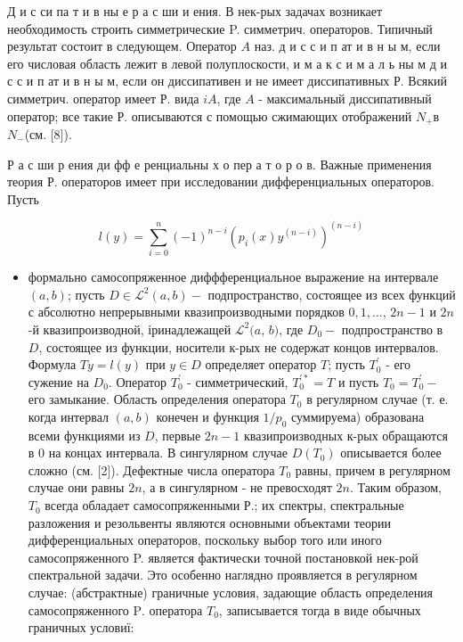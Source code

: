 \documentclass[10pt]{article}
\begin{document}
Д и с си па т и в ны е р а с ши и ения. В нек-рых задачах возникает необходимость строить симметрические P. симметрич. операторов. Типичный результат состоит в следующем. Оператор $A$ наз. д и с с и п ат и в н ы м, если его числовая область лежит в левой полуплоскости, и м а к с и м а л ь ны м д и с с и п ат и в н ы м, если он диссипативен и не имеет диссипативных Р. Всякий симметрич. оператор имеет Р. вида $i A$, где $A$ - максимальный диссипативный оператор; все такие Р. описываются с помощью сжимающих отображений $N_{+}$в $N_{-}$(см. [8]).



Р а с ши р ения ди фф е ренциальны х о пер а т о р о в. Важные применения теория Р. операторов имеет при исследовании дифференциальных операторов. Пусть



\[

l(y)=\sum_{i=0}^{n}(-1)^{n-i}\left(p_{i}(x) y^{(n-i)}\right)^{(n-i)}

\]



\begin{itemize}

  \item формально самосопряженное диффференциальное выражение на интервале $(a, b)$; пусть $D \in \mathscr{L}^{2}(a, b)-$ подпространство, состоящее из всех функций с абсолютно непрерывными квазипроизводными порядков $0,1, \ldots$, $2 n-1$ и $2 n$-й квазипроизводной, іринадлежащей $\mathscr{L}^{2}(a$, $b)$, где $D_{0}-$ подпространство в $D$, состоящее из функции, носители к-рых не содержат концов интервалов. Формула $T y=l(y)$ при $y \in D$ определяет оператор $T$; пусть $T_{0}^{\prime}$ - его сужение на $D_{0}$. Оператор $T_{0}^{\prime}$ - симметрический, $T_{0}^{\prime *}=T$ и пусть $T_{0}=T_{0}^{\prime}-$ его замыкание. Область определения оператора $T_{0}$ в регулярном случае (т. е. когда интервал $(a, b)$ конечен и функция $1 / p_{0}$ суммируема) образована всеми функциями из $D$, первые $2 n-1$ квазипроизводных к-рых обращаются в 0 на концах интервала. В сингулярном случае $D\left(T_{0}\right)$ описывается более сложно (см. [2]). Дефектные числа оператора $T_{0}$ равны, причем в регулярном случае они равны $2 n$, а в сингулярном - не превосходят $2 n$. Таким образом, $T_{0}$ всегда обладает самосопряженными Р.; их спектры, спектральные разложения и резольвенты являются основными объектами теории дифференциальных операторов, поскольку выбор того или иного самосопряженного P. является фактически точной постановкой нек-рой спектральной задачи. Это особенно наглядно проявляется в регулярном случае: (абстрактные) граничные условия, задающие область определения самосопряженного $\mathrm{P}$. оператора $T_{0}$, записывается тогда в виде обычных граничных условиї:

\end{itemize}
\end{document}
